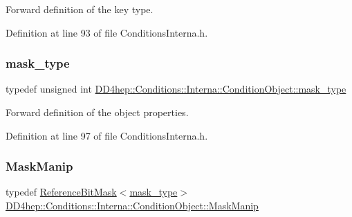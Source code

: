 Forward definition of the key type. 



Definition at line 93 of file Conditions\+Interna.\+h.

\hypertarget{class_d_d4hep_1_1_conditions_1_1_interna_1_1_condition_object_a1a9ff63fe2e060b973e6c2994b0a1370}{}\label{class_d_d4hep_1_1_conditions_1_1_interna_1_1_condition_object_a1a9ff63fe2e060b973e6c2994b0a1370} 
\subsubsection{\texorpdfstring{mask\+\_\+type}{mask\_type}}
{\footnotesize\ttfamily typedef unsigned int \hyperlink{class_d_d4hep_1_1_conditions_1_1_interna_1_1_condition_object_a1a9ff63fe2e060b973e6c2994b0a1370}{D\+D4hep\+::\+Conditions\+::\+Interna\+::\+Condition\+Object\+::mask\+\_\+type}}



Forward definition of the object properties. 



Definition at line 97 of file Conditions\+Interna.\+h.

\hypertarget{class_d_d4hep_1_1_conditions_1_1_interna_1_1_condition_object_a43dfd5df006474f17b7eba59b2f511fe}{}\label{class_d_d4hep_1_1_conditions_1_1_interna_1_1_condition_object_a43dfd5df006474f17b7eba59b2f511fe} 
\subsubsection{\texorpdfstring{Mask\+Manip}{MaskManip}}
{\footnotesize\ttfamily typedef \hyperlink{class_d_d4hep_1_1_reference_bit_mask}{Reference\+Bit\+Mask}$<$\hyperlink{class_d_d4hep_1_1_conditions_1_1_interna_1_1_condition_object_a1a9ff63fe2e060b973e6c2994b0a1370}{mask\+\_\+type}$>$ \hyperlink{class_d_d4hep_1_1_conditions_1_1_interna_1_1_condition_object_a43dfd5df006474f17b7eba59b2f511fe}{D\+D4hep\+::\+Conditions\+::\+Interna\+::\+Condition\+Object\+::\+Mask\+Manip}}




